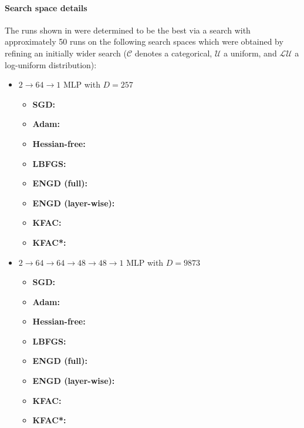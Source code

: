 \paragraph{Search space details} The runs shown in  were determined to be the best via a search with approximately 50 runs on the following search spaces which were obtained by refining an initially wider search ($\mathcal{C}$ denotes a categorical, $\mathcal{U}$ a uniform, and $\mathcal{LU}$ a log-uniform distribution):
\begin{itemize}
\item $2\to 64\to 1$ MLP with $D=257$
  \begin{itemize}
    \def\pathToRuns{kfac_pinns_exp/exp09_reproduce_poisson2d/tex}
  \item \textbf{SGD:} 
  \item \textbf{Adam:} 
  \item \textbf{Hessian-free:} 
  \item \textbf{LBFGS:} 
  \item \textbf{ENGD (full):} 
  \item \textbf{ENGD (layer-wise):} 
  \item \textbf{KFAC:} 
  \item \textbf{KFAC*:} 
  \end{itemize}

\item $2 \to 64 \to 64 \to 48 \to 48 \to 1$ MLP with $D=\num{9873}$
  \begin{itemize}
    \def\pathToRuns{kfac_pinns_exp/exp15_poisson2d_deepwide/tex}
  \item \textbf{SGD:} 
  \item \textbf{Adam:} 
  \item \textbf{Hessian-free:} 
  \item \textbf{LBFGS:} 
  \item \textbf{ENGD (full):} 
  \item \textbf{ENGD (layer-wise):} 
  \item \textbf{KFAC:} 
  \item \textbf{KFAC*:} 
  \end{itemize}


\end{itemize}

